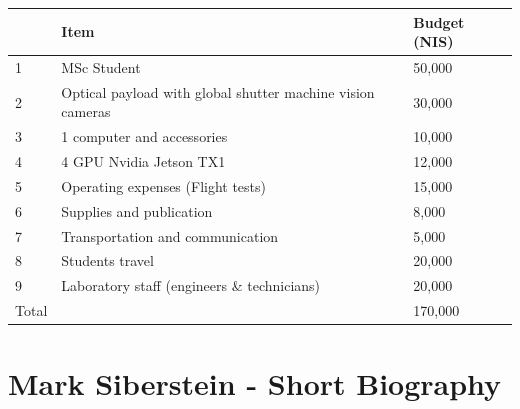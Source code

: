 \documentclass[a4paper]{article} %
\begin{document}
\begin{center}
	\begin{tabular}{ | l | l | l | }
		\hline
		      & Item                                                       & Budget (NIS) \\ \hline
		1     & MSc Student                                                & 50,000       \\ \hline
		2     & Optical payload with global shutter machine vision cameras & 30,000       \\ \hline
		3     & 1 computer and accessories                                 & 10,000       \\ \hline
		4     & 4 GPU Nvidia Jetson TX1                                    & 12,000       \\ \hline
		5     & Operating expenses (Flight tests)                          & 15,000       \\ \hline
		6     & Supplies and publication                                   & 8,000        \\ \hline
		7     & Transportation and communication                           & 5,000        \\ \hline
		8     & Students travel                                            & 20,000       \\ \hline
		9     & Laboratory staff (engineers \& technicians)                & 20,000       \\ \hline
		Total &                                                            & 170,000      \\ \hline
	\end{tabular}
\end{center}

\section{Mark Siberstein - Short Biography}



\end{document}
